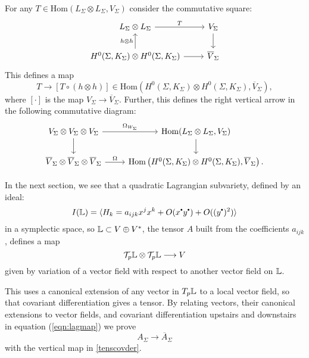     For any \( T\in\mathrm{Hom}(L_\Sigma \otimes L_\Sigma,V_\Sigma)\) consider the commutative square:
    \begin{equation}
        \begin{tikzcd} 
        L_\Sigma \otimes L_\Sigma \arrow{r}{T} & V_\Sigma \arrow{d} 
        \\ H^0(\Sigma,K_\Sigma)\otimes H^0(\Sigma,K_\Sigma)\arrow{r}\arrow{u}{h\otimes h} & \overline{V}_\Sigma  
    \end{tikzcd} 
    \end{equation}
    This defines a map
    \[ T \rightarrow [T\circ (h\otimes h)] \in \mathrm{Hom}(H^0(\Sigma,K_\Sigma)\otimes H^0(\Sigma,K_\Sigma),\overline{V}_\Sigma),\]
    where \([\cdot]\) is the map \(V_\Sigma\to\overline{V}_\Sigma\). Further, this defines the right vertical arrow in the following commutative diagram:
    \begin{equation}  \label{tenscovder}
        \begin{tikzcd}
        V_\Sigma\otimes V_\Sigma\otimes V_\Sigma\arrow{d}\arrow{r}{\Omega_{W_\Sigma}}  & \mathrm{Hom} (L_\Sigma \otimes L_\Sigma,V_\Sigma)\arrow{d}  \\
        \overline{V}_\Sigma\otimes \overline{V}_\Sigma\otimes \overline{V}_\Sigma  \arrow{r}{\Omega} &
    \mathrm{Hom}\left(H^0(\Sigma,K_\Sigma)\otimes H^0(\Sigma,K_\Sigma),\overline{V}_\Sigma \right). 
    \end{tikzcd}
    \end{equation}
    
    In the next section, we see that a quadratic Lagrangian subvariety, defined by an ideal:
    \[I(\cL) =  \langle H_k = a_{ijk} x^j x^k + O(x^{\sbt}y^{\sbt}) + O((y^{\sbt})^2) \rangle \]
    in a symplectic space, so \(\mathbb{L}  \subset V\oplus V^*\), the tensor \(A\) built from the coefficients \( a_{ijk}\), defines a map
    \[ \mathcal{T}_p \mathbb{L} \otimes \mathcal{T}_p \mathbb{L} \longrightarrow V\]
    given by variation of a vector field with respect to another vector field on \( \mathbb{L}\).  
    
    This uses a canonical extension of any vector in \(T_p \mathbb{L}\) to a local vector field, so that covariant differentiation gives a tensor. By relating vectors, their canonical extensions to vector fields, and covariant differentiation upstairs and downstairs in equation (\ref{eqn:lagmap})  we prove \[ A_\Sigma \longrightarrow \overline{A}_\Sigma \] 
    with the vertical map in \eqref{tenscovder}.       
    
    


